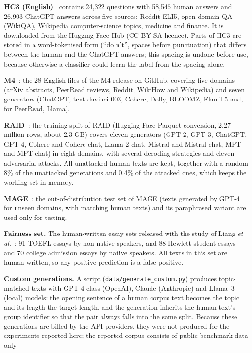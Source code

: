 \textbf{HC3 (English)}~\cite{guo2023hc3} contains 24,322 questions with 58,546
human answers and 26,903 ChatGPT answers across five sources: Reddit ELI5,
open-domain QA (WikiQA), Wikipedia computer-science topics, medicine and
finance. It is downloaded from the Hugging Face Hub (CC-BY-SA licence). Parts
of HC3 are stored in a word-tokenised form (``do n't'', spaces before
punctuation) that differs between the human and the ChatGPT answers; this
spacing is undone before use, because otherwise a classifier could learn the
label from the spacing alone.

\textbf{M4}~\cite{wang2024m4}: the 28 English files of the M4 release on
GitHub, covering five domains (arXiv abstracts, PeerRead reviews, Reddit,
WikiHow and Wikipedia) and seven generators (ChatGPT, text-davinci-003, Cohere,
Dolly, BLOOMZ, Flan-T5 and, for PeerRead, Llama).

\textbf{RAID}~\cite{dugan2024raid}: the training split of RAID (Hugging Face
Parquet conversion, 2.27 million rows, about 2.3 GB) covers eleven generators
(GPT-2, GPT-3, ChatGPT, GPT-4, Cohere and Cohere-chat, Llama-2-chat, Mistral
and Mistral-chat, MPT and MPT-chat) in eight domains, with several decoding
strategies and eleven adversarial attacks. All unattacked human texts are
kept, together with a random 8\% of the unattacked generations and 0.4\% of
the attacked ones, which keeps the working set in memory.

\textbf{MAGE}~\cite{li2024mage}: the out-of-distribution test set of MAGE
(texts generated by GPT-4 for unseen domains, with matching human texts) and
its paraphrased variant are used only for testing.

\textbf{Fairness set.} The human-written essay sets released with the study of
Liang \textit{et al.}~\cite{liang2023biased}: 91 TOEFL essays by non-native
speakers, and 88 Hewlett student essays and 70 college admission essays by
native speakers. All texts in this set are human-written, so any positive
prediction is a false positive.

\textbf{Custom generations.} A script (\texttt{data/generate\_custom.py})
produces topic-matched texts with GPT-4-class (OpenAI), Claude (Anthropic) and
Llama~3 (local) models: the opening sentence of a human corpus text becomes
the topic and its length the target length, and the generation inherits the
human text's group identifier so that the pair always falls into the same
split. Because these generations are billed by the API providers, they were
not produced for the experiments reported here; the reported corpus consists
of public benchmark data only.

